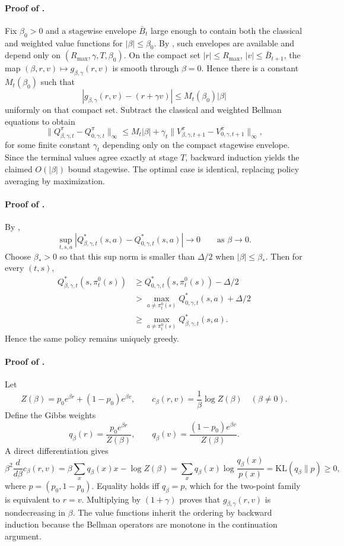 \documentclass{article}
\theoremstyle{remark}
\newcommand{\KL}{\mathrm{KL}}
\newcommand{\pprior}{p_0}
\begin{document}
\paragraph{Proof of .}
Fix $\beta_0>0$ and a stagewise envelope $\bar B_t$ large enough to contain both the classical and weighted value functions for $|\beta|\le \beta_0$.
By , such envelopes are available and depend only on $(R_{\max},\gamma,T,\beta_0)$.
On the compact set $|r|\le R_{\max}$, $|v|\le \bar B_{t+1}$, the map $(\beta,r,v)\mapsto g_{\beta,\gamma}(r,v)$ is smooth through $\beta=0$.
Hence there is a constant $M_t(\beta_0)$ such that
\[
|g_{\beta,\gamma}(r,v)-(r+\gamma v)|\le M_t(\beta_0)|\beta|
\]
uniformly on that compact set.
Subtract the classical and weighted Bellman equations to obtain
\[
\|Q_{\beta,\gamma,t}^{\pi}-Q_{0,\gamma,t}^{\pi}\|_\infty
\le M_t|\beta| + \gamma_t\|V_{\beta,\gamma,t+1}^{\pi}-V_{0,\gamma,t+1}^{\pi}\|_\infty,
\]
for some finite constant $\gamma_t$ depending only on the compact stagewise envelope.
Since the terminal values agree exactly at stage $T$, backward induction yields the claimed $O(|\beta|)$ bound stagewise.
The optimal case is identical, replacing policy averaging by maximization.

\paragraph{Proof of .}
By ,
\[
\sup_{t,s,a}|Q^*_{\beta,\gamma,t}(s,a)-Q^*_{0,\gamma,t}(s,a)|\to 0
\qquad \text{as } \beta\to 0.
\]
Choose $\beta_*>0$ so that this sup norm is smaller than $\Delta/2$ when $|\beta|\le \beta_*$.
Then for every $(t,s)$,
\begin{align*}
Q^*_{\beta,\gamma,t}(s,\pi_t^0(s))
&\ge Q^*_{0,\gamma,t}(s,\pi_t^0(s)) - \Delta/2\\
&> \max_{a\neq \pi_t^0(s)}Q^*_{0,\gamma,t}(s,a)+\Delta/2\\
&\ge \max_{a\neq \pi_t^0(s)}Q^*_{\beta,\gamma,t}(s,a).
\end{align*}
Hence the same policy remains uniquely greedy.

\paragraph{Proof of .}
Let
\[
Z(\beta)=\pprior e^{\beta r}+(1-\pprior)e^{\beta v},
\qquad
c_\beta(r,v)=\frac{1}{\beta}\log Z(\beta)
\quad (\beta\neq 0).
\]
Define the Gibbs weights
\[
q_\beta(r)=\frac{\pprior e^{\beta r}}{Z(\beta)},
\qquad
q_\beta(v)=\frac{(1-\pprior)e^{\beta v}}{Z(\beta)}.
\]
A direct differentiation gives
\[
\beta^2\frac{d}{d\beta}c_\beta(r,v)
=\beta\sum_x q_\beta(x)x - \log Z(\beta)
=\sum_x q_\beta(x)\log\frac{q_\beta(x)}{p(x)}
=\KL(q_\beta\|p)\ge 0,
\]
where $p=(\pprior,1-\pprior)$.
Equality holds iff $q_\beta=p$, which for the two-point family is equivalent to $r=v$.
Multiplying by $(1+\gamma)$ proves that $g_{\beta,\gamma}(r,v)$ is nondecreasing in $\beta$.
The value functions inherit the ordering by backward induction because the Bellman operators are monotone in the continuation argument.
\end{document}
